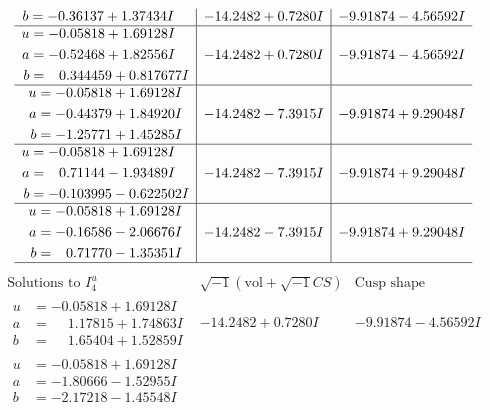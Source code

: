 \documentclass[1p]{elsarticle_modified}
\theoremstyle{definition}
\newcommand{\I}{\sqrt{-1}}
\begin{document}
$$\begin{array}{c|c|c}
\begin{aligned}
b &= -0.36137 + 1.37434 I\end{aligned}
 & -14.2482 + 0.7280 I & -9.91874 - 4.56592 I \\ \hline\begin{aligned}
u &= -0.05818 + 1.69128 I \\
a &= -0.52468 + 1.82556 I \\
b &= \phantom{-}0.344459 + 0.817677 I\end{aligned}
 & -14.2482 + 0.7280 I & -9.91874 - 4.56592 I \\ \hline\begin{aligned}
u &= -0.05818 + 1.69128 I \\
a &= -0.44379 + 1.84920 I \\
b &= -1.25771 + 1.45285 I\end{aligned}
 & -14.2482 - 7.3915 I & -9.91874 + 9.29048 I \\ \hline\begin{aligned}
u &= -0.05818 + 1.69128 I \\
a &= \phantom{-}0.71144 - 1.93489 I \\
b &= -0.103995 - 0.622502 I\end{aligned}
 & -14.2482 - 7.3915 I & -9.91874 + 9.29048 I \\ \hline\begin{aligned}
u &= -0.05818 + 1.69128 I \\
a &= -0.16586 - 2.06676 I \\
b &= \phantom{-}0.71770 - 1.35351 I\end{aligned}
 & -14.2482 - 7.3915 I & -9.91874 + 9.29048 I\\
 \hline 
 \end{array}$$\newpage$$\begin{array}{c|c|c}  
\text{Solutions to }I^u_{4}& \I (\text{vol} + \sqrt{-1}CS) & \text{Cusp shape}\\
 \hline 
\begin{aligned}
u &= -0.05818 + 1.69128 I \\
a &= \phantom{-}1.17815 + 1.74863 I \\
b &= \phantom{-}1.65404 + 1.52859 I\end{aligned}
 & -14.2482 + 0.7280 I & -9.91874 - 4.56592 I \\ \hline\begin{aligned}
u &= -0.05818 + 1.69128 I \\
a &= -1.80666 - 1.52955 I \\
b &= -2.17218 - 1.45548 I\end{aligned}

\end{array}$$
\end{document}
